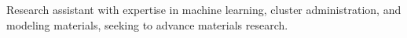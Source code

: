 \vspace*{1px}

Research assistant with expertise in machine learning, cluster administration, and modeling materials, seeking to advance materials research.
